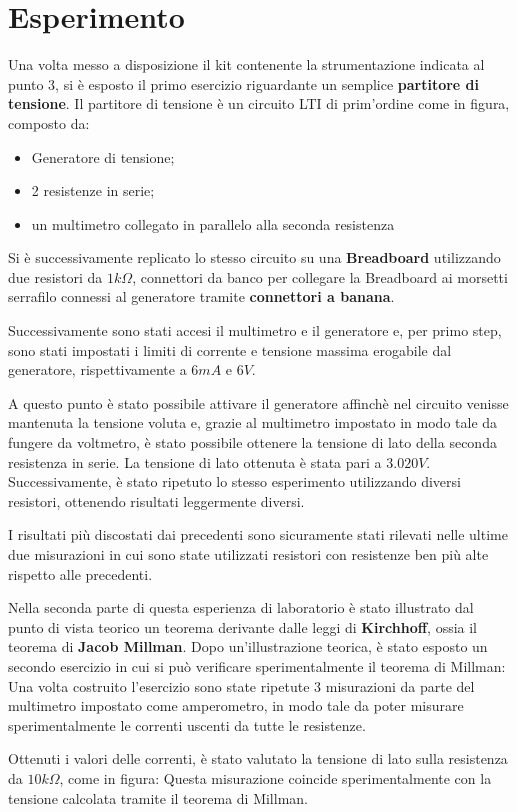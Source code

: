     \section{Esperimento}
    Una volta messo a disposizione il kit contenente la strumentazione indicata al punto $3$, %
    si è esposto il primo esercizio riguardante un semplice \textbf{partitore di tensione}.
    Il partitore di tensione è un circuito LTI di prim'ordine come in figura, composto da:
    \begin{itemize}
        \item Generatore di tensione;
        \item 2 resistenze in serie;
        \item un multimetro collegato in parallelo alla seconda resistenza
    \end{itemize}
    Si è successivamente replicato lo stesso circuito su una \textbf{Breadboard} utilizzando due resistori da
    $1k\Omega$, connettori da banco per collegare la Breadboard ai morsetti serrafilo connessi al generatore
    tramite \textbf{connettori a banana}. \par
    Successivamente sono stati accesi il multimetro e il generatore e, per primo step, sono stati impostati i limiti di corrente e tensione massima
    erogabile dal generatore, rispettivamente a $6mA$ e $6V$.\par
    A questo punto è stato possibile attivare il generatore affinchè nel circuito venisse mantenuta la tensione voluta e,
    grazie al multimetro impostato in modo tale da fungere da voltmetro, è stato possibile ottenere la tensione di lato della
    seconda resistenza in serie. La tensione di lato ottenuta è stata pari a $3.020V$.
    Successivamente, è stato ripetuto lo stesso esperimento utilizzando diversi resistori, ottenendo risultati leggermente diversi.\par
    I risultati più discostati dai precedenti sono sicuramente stati rilevati nelle ultime due misurazioni in cui sono state utilizzati
    resistori con resistenze ben più alte rispetto alle precedenti.\par
    \par
    Nella seconda parte di questa esperienza di laboratorio è stato illustrato dal punto di vista teorico
    un teorema derivante dalle leggi di \textbf{Kirchhoff}, ossia il teorema di \textbf{Jacob Millman}.
    Dopo un'illustrazione teorica, è stato esposto un secondo esercizio in cui si può verificare sperimentalmente il teorema di Millman:
    Una volta costruito l'esercizio sono state ripetute 3 misurazioni da parte del multimetro impostato come 
    amperometro, in modo tale da poter misurare sperimentalmente le correnti uscenti da tutte le resistenze.\par
    Ottenuti i valori delle correnti, è stato valutato la tensione di lato sulla resistenza da $10k\Omega$, come in figura:
    Questa misurazione coincide sperimentalmente con la tensione calcolata tramite il teorema di Millman.

